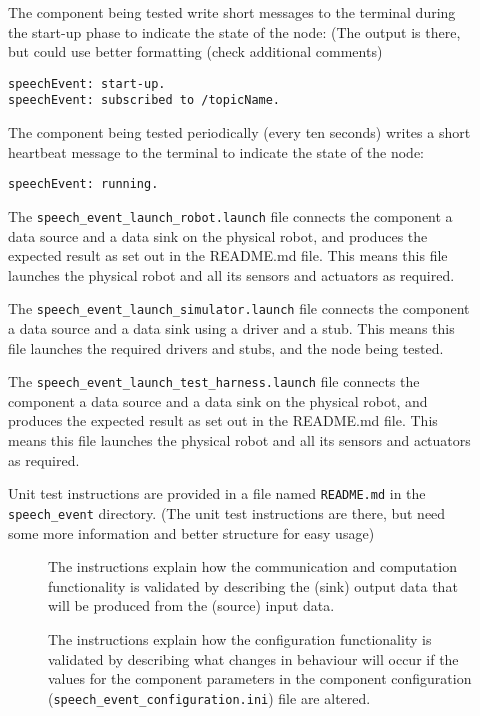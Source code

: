 \documentclass{CSSRforAfrica}
\newcommand{\checkboxChecked}{\fbox{\ding{51}}} %
\newcommand{\checkboxDashed}{\fbox{--}}         %
\begin{document}
\begin{description}
\item[\checkboxChecked]  The component being tested write short messages to the terminal during the start-up phase to indicate the state of the node: (The output is there, but could use better formatting (check additional comments)
{\small 
\begin{verbatim}
speechEvent: start-up.
speechEvent: subscribed to /topicName.
\end{verbatim}}

\item[\checkboxChecked]   The component being tested periodically (every ten seconds) writes a short heartbeat message to the terminal to indicate the state of the node:
{\small 
\begin{verbatim}
speechEvent: running.
\end{verbatim}}

\item[\checkboxDashed] The {\small \verb+speech_event_launch_robot.launch+} file connects the component a data source and a data sink on the physical robot, and produces the expected result as set out in the README.md file. This means this file launches the physical robot and all its sensors and actuators as required.

\item[\checkboxDashed]   The {\small \verb+speech_event_launch_simulator.launch+} file connects the component a data source and a data sink using a driver and a stub. This means this file launches the required drivers and stubs, and the node being tested.

\item[\checkboxDashed]   The {\small \verb+speech_event_launch_test_harness.launch+} file connects the component a data source and a data sink on the physical robot, and produces the expected result as set out in the README.md file. This means this file launches the physical robot and all its sensors and actuators as required.

\item[\checkboxChecked] Unit test instructions are provided in a file named {\small \verb+README.md+} in the  {\small \verb+speech_event+} directory. (The unit test instructions are there, but need some more information and better structure for easy usage)


\begin{description}

\item[\checkboxChecked] The instructions explain how the communication and computation functionality is validated by describing the (sink) output data that will be produced from the (source) input data.  

\item[\checkboxChecked] The instructions explain how the configuration functionality is validated by describing what changes in behaviour will occur if the values for the component parameters in the component configuration ({\small \verb+speech_event_configuration.ini+}) file are altered.

\end{description}

\end{description} 
\end{document}
